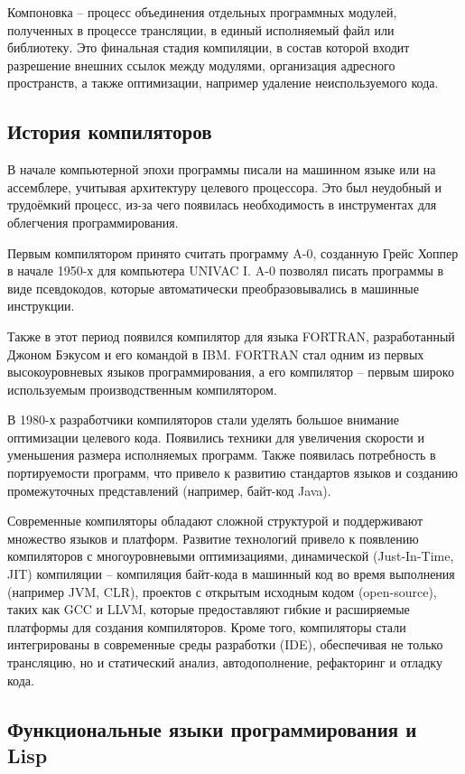 Компоновка -- процесс объединения отдельных программных модулей, полученных в процессе трансляции, в единый исполняемый файл или библиотеку. Это финальная стадия компиляции, в состав которой входит разрешение внешних ссылок между модулями, организация адресного пространств, а также оптимизации, например удаление неиспользуемого кода.

\subsection{История компиляторов}

В начале компьютерной эпохи программы писали на машинном языке или на ассемблере, учитывая архитектуру целевого процессора. Это был неудобный и трудоёмкий процесс, из-за чего появилась необходимость в инструментах для облегчения программирования.

Первым компилятором принято считать программу A-0, созданную Грейс Хоппер в начале 1950-х для компьютера UNIVAC I. A-0 позволял писать программы в виде псевдокодов, которые автоматически преобразовывались в машинные инструкции.

Также в этот период появился компилятор для языка FORTRAN, разработанный Джоном Бэкусом и его командой в IBM. FORTRAN стал одним из первых высокоуровневых языков программирования, а его компилятор -- первым широко используемым производственным компилятором.

В 1980-х разработчики компиляторов стали уделять большое внимание оптимизации целевого кода. Появились техники для увеличения скорости и уменьшения размера исполняемых программ. Также появилась потребность в портируемости программ, что привело к развитию стандартов языков и созданию промежуточных представлений (например, байт-код Java).

Современные компиляторы обладают сложной структурой и поддерживают множество языков и платформ. Развитие технологий привело к появлению компиляторов с многоуровневыми оптимизациями, динамической (Just-In-Time, JIT) компиляции -- компиляция байт-кода в машинный код во время выполнения (например JVM, CLR), проектов с открытым исходным кодом (open-source), таких как GCC и LLVM, которые предоставляют гибкие и расширяемые платформы для создания компиляторов. Кроме того, компиляторы стали интегрированы в современные среды разработки (IDE), обеспечивая не только трансляцию, но и статический анализ, автодополнение, рефакторинг и отладку кода.

\subsection{Функциональные языки программирования и Lisp}

